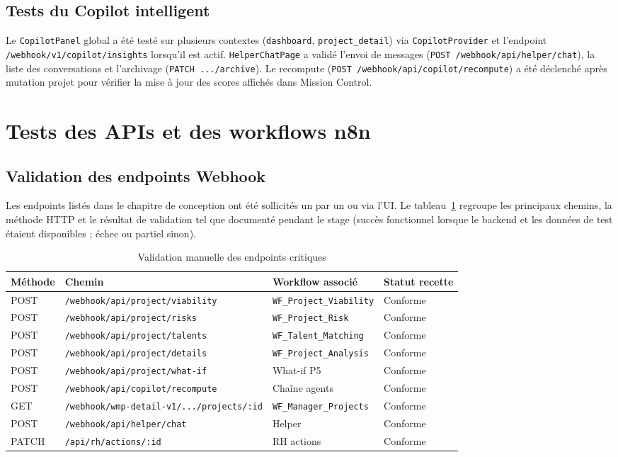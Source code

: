 \subsection{Tests du Copilot intelligent}

Le \texttt{CopilotPanel} global a été testé sur plusieurs contextes (\texttt{dashboard}, \texttt{project\_detail}) via \texttt{CopilotProvider} et l'endpoint \texttt{/webhook/v1/copilot/insights} lorsqu'il est actif. \texttt{HelperChatPage} a validé l'envoi de messages (\texttt{POST /webhook/api/helper/chat}), la liste des conversations et l'archivage (\texttt{PATCH .../archive}). Le recompute (\texttt{POST /webhook/api/copilot/recompute}) a été déclenché après mutation projet pour vérifier la mise à jour des scores affichés dans Mission Control.

\section{Tests des APIs et des workflows n8n}

\subsection{Validation des endpoints Webhook}

Les endpoints listés dans le chapitre de conception ont été sollicités un par un ou via l'UI. Le tableau~\ref{tab:api-test-ch6} regroupe les principaux chemins, la méthode HTTP et le résultat de validation tel que documenté pendant le stage (succès fonctionnel lorsque le backend et les données de test étaient disponibles ; échec ou partiel sinon).

\begin{table}[htbp]
\centering
\caption{Validation manuelle des endpoints critiques}
\label{tab:api-test-ch6}
\begin{tabular}{@{}lllp{2.8cm}@{}}
\toprule
\textbf{Méthode} & \textbf{Chemin} & \textbf{Workflow associé} & \textbf{Statut recette} \\
\midrule
POST & \texttt{/webhook/api/project/viability} & \texttt{WF\_Project\_Viability} & Conforme \\
POST & \texttt{/webhook/api/project/risks} & \texttt{WF\_Project\_Risk} & Conforme \\
POST & \texttt{/webhook/api/project/talents} & \texttt{WF\_Talent\_Matching} & Conforme \\
POST & \texttt{/webhook/api/project/details} & \texttt{WF\_Project\_Analysis} & Conforme \\
POST & \texttt{/webhook/api/project/what-if} & What-if P5 & Conforme \\
POST & \texttt{/webhook/api/copilot/recompute} & Chaîne agents & Conforme \\
GET & \texttt{/webhook/wmp-detail-v1/.../projects/:id} & \texttt{WF\_Manager\_Projects} & Conforme \\
POST & \texttt{/webhook/api/helper/chat} & Helper & Conforme \\
PATCH & \texttt{/api/rh/actions/:id} & RH actions & Conforme \\
\bottomrule
\end{tabular}
\end{table}

